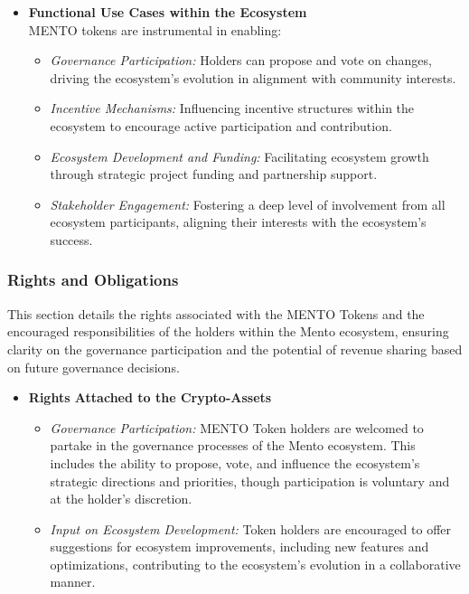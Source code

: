 \documentclass[a4paper]{article}
\theoremstyle{definition}
\begin{document}
\begin{appendices}
\begin{itemize}
    \item \textbf{Functional Use Cases within the Ecosystem}\\
    MENTO tokens are instrumental in enabling:
    \begin{itemize}
        \item \textit{Governance Participation:} Holders can propose and vote on changes, driving the ecosystem's evolution in alignment with community interests.
        \item \textit{Incentive Mechanisms:} Influencing incentive structures within the ecosystem to encourage active participation and contribution.
        \item \textit{Ecosystem Development and Funding:} Facilitating ecosystem growth through strategic project funding and partnership support.
        \item \textit{Stakeholder Engagement:} Fostering a deep level of involvement from all ecosystem participants, aligning their interests with the ecosystem's success.
    \end{itemize}
\end{itemize}


\subsubsection{Rights and Obligations}
This section details the rights associated with the MENTO Tokens and the encouraged responsibilities of the holders within the Mento ecosystem, ensuring clarity on the governance participation and the potential of revenue sharing based on future governance decisions.

\begin{itemize}
    \item \textbf{Rights Attached to the Crypto-Assets}
    \begin{itemize}
        \item \textit{Governance Participation:} MENTO Token holders are welcomed to partake in the governance processes of the Mento ecosystem. This includes the ability to propose, vote, and influence the ecosystem's strategic directions and priorities, though participation is voluntary and at the holder's discretion.
        
        \item \textit{Input on Ecosystem Development:} Token holders are encouraged to offer suggestions for ecosystem improvements, including new features and optimizations, contributing to the ecosystem's evolution in a collaborative manner.
        

\end{itemize}
\end{itemize}
\end{appendices}
\end{document}
